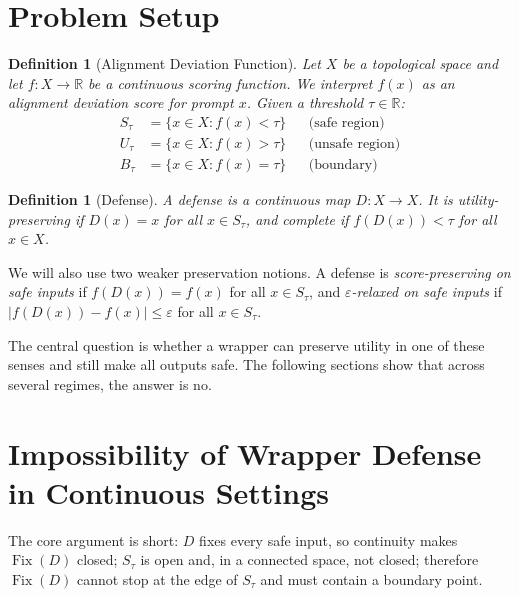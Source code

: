 \documentclass[11pt]{article}
\newtheorem{definition}[theorem]{Definition}
\newcommand{\R}{\mathbb{R}}
\newcommand{\Fix}{\operatorname{Fix}}
\begin{document}
\section{Problem Setup}
\label{sec:setup}

\begin{definition}[Alignment Deviation Function]
\label{def:ad}
Let $X$ be a topological space and let $f\colon X \to \R$ be a
continuous scoring function. We interpret $f(x)$ as an alignment
deviation score for prompt $x$. Given a threshold $\tau\in\R$:
\begin{align}
  S_\tau &= \{x \in X : f(x) < \tau\}  &&\text{(safe region)} \\
  U_\tau &= \{x \in X : f(x) > \tau\}  &&\text{(unsafe region)} \\
  B_\tau &= \{x \in X : f(x) = \tau\}  &&\text{(boundary)}
\end{align}
\end{definition}

\begin{definition}[Defense]
\label{def:defense}
A \emph{defense} is a continuous map $D\colon X \to X$. It is
\emph{utility-preserving} if $D(x) = x$ for all $x \in S_\tau$, and
\emph{complete} if $f(D(x)) < \tau$ for all $x\in X$.
\end{definition}

We will also use two weaker preservation notions. A defense is
\emph{score-preserving on safe inputs} if $f(D(x)) = f(x)$ for all
$x \in S_\tau$, and \emph{$\varepsilon$-relaxed on safe inputs} if
$|f(D(x)) - f(x)| \leq \varepsilon$ for all $x \in S_\tau$.

The central question is whether a wrapper can preserve utility in one
of these senses and still make all outputs safe. The following sections
show that across several regimes, the answer is no.


\section{Impossibility of Wrapper Defense in Continuous Settings}
\label{sec:boundary}

The core argument is short: $D$ fixes every safe input, so continuity
makes $\Fix(D)$ closed; $S_\tau$ is open and, in a connected space, not
closed; therefore $\Fix(D)$ cannot stop at the edge of $S_\tau$ and must
contain a boundary point.
\end{document}
